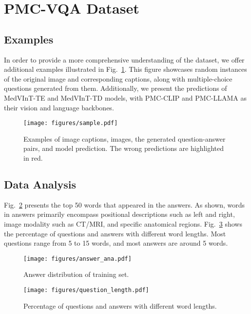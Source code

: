 \documentclass{article}
\begin{document}
%
 


\clearpage
\renewcommand*\contentsname{Supplementary}
\appendix

\section{PMC-VQA Dataset}

\subsection{Examples}
In order to provide a more comprehensive understanding of the dataset, we offer additional examples illustrated in Fig.~\ref{Sample}. This figure showcases random instances of the original image and corresponding captions, along with multiple-choice questions generated from them. Additionally, we present the predictions of MedVInT-TE and MedVInT-TD models, with PMC-CLIP and PMC-LLAMA as their vision and language backbones.


\begin{figure}[htb]
    \centering
    \texttt{[image: figures/sample.pdf]}
    \caption{Examples of image captions, images, the generated question-answer pairs, and model prediction. The wrong predictions are highlighted in red.}
    \label{Sample}
    \vspace{-0.5cm}
\end{figure}


\subsection{Data Analysis}
Fig.~\ref{fig:answer_distribution} presents the top 50 words that appeared in the answers. As shown, words in answers primarily encompass positional descriptions such as left and right, image modality such as CT/MRI, and specific anatomical regions.
Fig.~\ref{fig:question_length} shows the percentage of questions and answers with different word lengths.
Most questions range from 5 to 15 words, and most answers are around 5 words.


\begin{figure}[htb]
    \centering
    \texttt{[image: figures/answer\_ana.pdf]}
    \caption{Answer distribution of training set.}
    \label{fig:answer_distribution}
\end{figure}

\begin{figure}[htb]
    \centering
    \texttt{[image: figures/question\_length.pdf]}
    \caption{Percentage of questions and answers with different word lengths.}
    \label{fig:question_length}
\end{figure}
\end{document}
